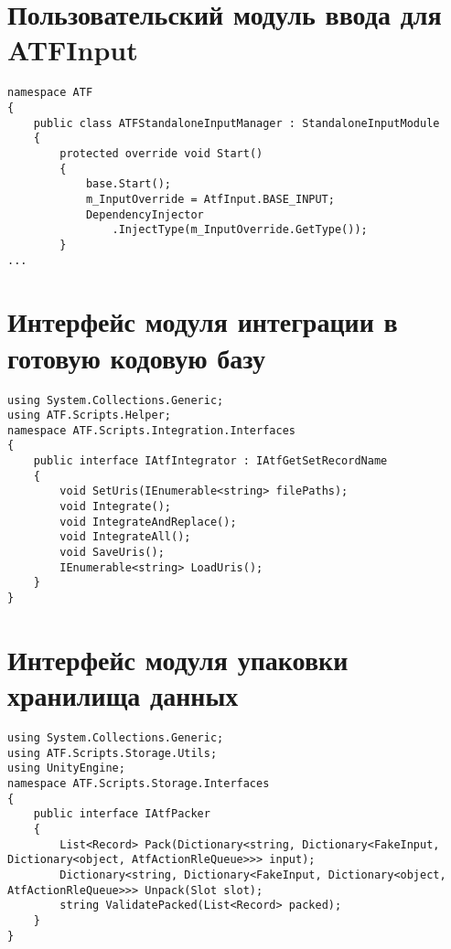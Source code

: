 \section{Пользовательский модуль ввода для ATFInput}
\begin{lstlisting}[caption={Пользовательский модуль ввода для ATFInput},label=inputModule]
namespace ATF
{
	public class ATFStandaloneInputManager : StandaloneInputModule
	{
		protected override void Start()
        {
            base.Start();
            m_InputOverride = AtfInput.BASE_INPUT;
            DependencyInjector
            	.InjectType(m_InputOverride.GetType());
        }
...
\end{lstlisting}
\newpage
\section{Интерфейс модуля интеграции в готовую кодовую базу}
\begin{lstlisting}[caption={Интерфейс модуля интеграции в готовую кодовую базу},label=iIntegrator]
using System.Collections.Generic;
using ATF.Scripts.Helper;
namespace ATF.Scripts.Integration.Interfaces
{
	public interface IAtfIntegrator : IAtfGetSetRecordName
	{
		void SetUris(IEnumerable<string> filePaths);
		void Integrate();
		void IntegrateAndReplace();
		void IntegrateAll();
		void SaveUris();
		IEnumerable<string> LoadUris();
	}
}
\end{lstlisting}
\newpage
\section{Интерфейс модуля упаковки хранилища данных}
\begin{lstlisting}[caption={Интерфейс модуля упаковки хранилища данных},label=iPacker]
using System.Collections.Generic;
using ATF.Scripts.Storage.Utils;
using UnityEngine;
namespace ATF.Scripts.Storage.Interfaces
{
	public interface IAtfPacker
	{
		List<Record> Pack(Dictionary<string, Dictionary<FakeInput, Dictionary<object, AtfActionRleQueue>>> input);
		Dictionary<string, Dictionary<FakeInput, Dictionary<object, AtfActionRleQueue>>> Unpack(Slot slot);
		string ValidatePacked(List<Record> packed);
	}
}
\end{lstlisting}
\newpage
